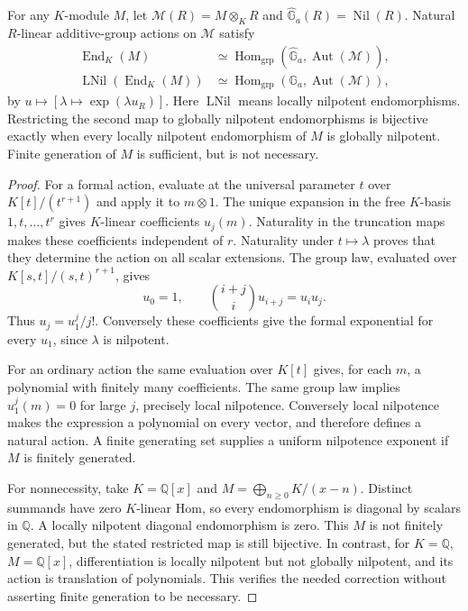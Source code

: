 \begin{theorem}
\label{C:module-actions}
For any $K$-module $M$, let $\mathcal M(R)=M\otimes_K R$ and
$\widehat{\mathbb G}_a(R)=\operatorname{Nil}(R)$. Natural $R$-linear additive-group actions on $\mathcal M$ satisfy
\begin{align*}
\operatorname{End}_K(M)&\simeq
\operatorname{Hom}_{\mathrm{grp}}(\widehat{\mathbb G}_a,\operatorname{Aut}(\mathcal M)),\\
\operatorname{LNil}(\operatorname{End}_K(M))&\simeq
\operatorname{Hom}_{\mathrm{grp}}(\mathbb G_a,\operatorname{Aut}(\mathcal M)),
\end{align*}
by $u\mapsto[\lambda\mapsto\exp(\lambda u_R)]$.
Here $\operatorname{LNil}$ means locally nilpotent endomorphisms. Restricting the second map to globally nilpotent endomorphisms is bijective exactly when every locally nilpotent endomorphism of $M$ is globally nilpotent. Finite generation of $M$ is sufficient, but is not necessary.
\end{theorem}
\begin{proof}
For a formal action, evaluate at the universal parameter $t$ over $K[t]/(t^{r+1})$ and apply it to $m\otimes1$. The unique expansion in the free $K$-basis $1,t,\ldots,t^r$ gives $K$-linear coefficients $u_j(m)$. Naturality in the truncation maps makes these coefficients independent of $r$. Naturality under $t\mapsto\lambda$ proves that they determine the action on all scalar extensions. The group law, evaluated over $K[s,t]/(s,t)^{r+1}$, gives
\[
u_0=1,\qquad \binom{i+j}{i}u_{i+j}=u_i u_j.
\]
Thus $u_j=u_1^j/j!$. Conversely these coefficients give the formal exponential for every $u_1$, since $\lambda$ is nilpotent.

For an ordinary action the same evaluation over $K[t]$ gives, for each $m$, a polynomial with finitely many coefficients. The same group law implies $u_1^j(m)=0$ for large $j$, precisely local nilpotence. Conversely local nilpotence makes the expression a polynomial on every vector, and therefore defines a natural action. A finite generating set supplies a uniform nilpotence exponent if $M$ is finitely generated.

For nonnecessity, take $K=\mathbb Q[x]$ and $M=\bigoplus_{n\geq0}K/(x-n)$. Distinct summands have zero $K$-linear Hom, so every endomorphism is diagonal by scalars in $\mathbb Q$. A locally nilpotent diagonal endomorphism is zero. This $M$ is not finitely generated, but the stated restricted map is still bijective. In contrast, for $K=\mathbb Q$, $M=\mathbb Q[x]$, differentiation is locally nilpotent but not globally nilpotent, and its action is translation of polynomials. This verifies the needed correction without asserting finite generation to be necessary.
\end{proof}

